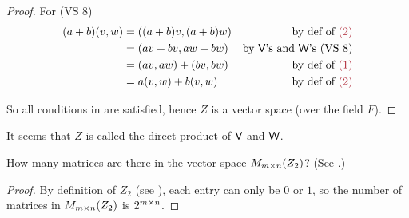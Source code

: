 \begin{proof}
For (VS 8)
\begin{align*}
    (a + b)(v, w) & = ((a + b)v , (a + b)w) & \text{by def of \MAROON{(2)}} \\
                               & = (av + bv, aw + bw) & \text{by \(\V\)'s and \(\W\)'s (VS 8)} \\
                               & = (av, aw) + (bv, bw) & \text{by def of \MAROON{(1)}} \\
                               & = a(v, w) + b(v, w) & \text{by def of \MAROON{(2)}}
\end{align*}

So all conditions in  are satisfied, hence \(Z\) is a vector space (over the field \(F\)).
\end{proof}

\begin{note}
It seems that \(Z\) is called the \href{https://www.wikiwand.com/en/Direct_product}{direct product} of \(\textsf{V}\) and \(\textsf{W}\).
\end{note}

\begin{exercise} \label{exercise 1.2.22}
How many matrices are there in the vector space \(M_{m \times n}(Z_2)\)? (See .)
\end{exercise}

\begin{proof}
By definition of \(Z_2\) (see ), each entry can only be \(0\) or \(1\), so the number of matrices in \(M_{m \times n}(Z_2)\) is \(2^{m \times n}\).
\end{proof}